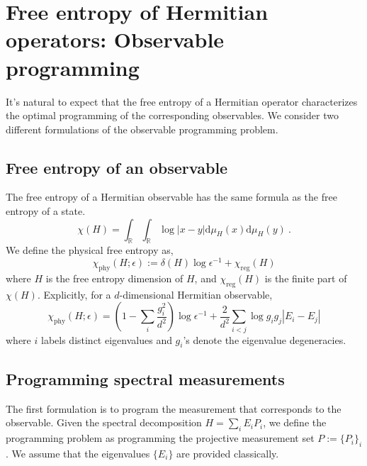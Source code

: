 \documentclass[11pt,letterpaper]{article}
\newcommand{\dd}{\mathrm{d}}
\begin{document}
\section{Free entropy of Hermitian operators: Observable programming}
It's natural to expect that the free entropy of a Hermitian operator characterizes the optimal programming of the corresponding observables. We consider two different formulations of the observable programming problem.


\subsection{Free entropy of an observable}
The free entropy of a Hermitian observable has the same formula as the free entropy of a state.
\begin{equation}
    \chi(H) = \int_\mathbb{R}\int_\mathbb{R}\log|x-y|\dd\mu_H(x)\dd\mu_H(y)\ .
\end{equation}
We define the physical free entropy as,
\begin{equation}
    \chi_\mathrm{phy}(H;\epsilon):=\delta(H)\log\epsilon^{-1} + \chi_\mathrm{reg}(H)
\end{equation}
where $H$ is the free entropy dimension of $H$, and $\chi_\mathrm{reg}(H)$ is the finite part of $\chi(H)$. Explicitly, for a $d$-dimensional Hermitian observable,
\begin{equation}
    \chi_\mathrm{phy}(H;\epsilon) = \left(1-\sum_i \frac{g_i^2}{d^2}\right)\log\epsilon^{-1} + \frac{2}{d^2}\sum_{i < j}\log g_ig_j|E_i-E_j|
\end{equation}
where $i$ labels distinct eigenvalues and $g_i$'s denote the eigenvalue degeneracies.


\subsection{Programming spectral measurements}

The first formulation is to program the measurement that corresponds to the observable. Given the spectral decomposition $H=\sum_i E_i P_i$, we define the programming problem as programming the projective measurement set $P:=\{P_i\}_i$. We assume that the eigenvalues $\{E_i\}$ are provided classically.
\end{document}
